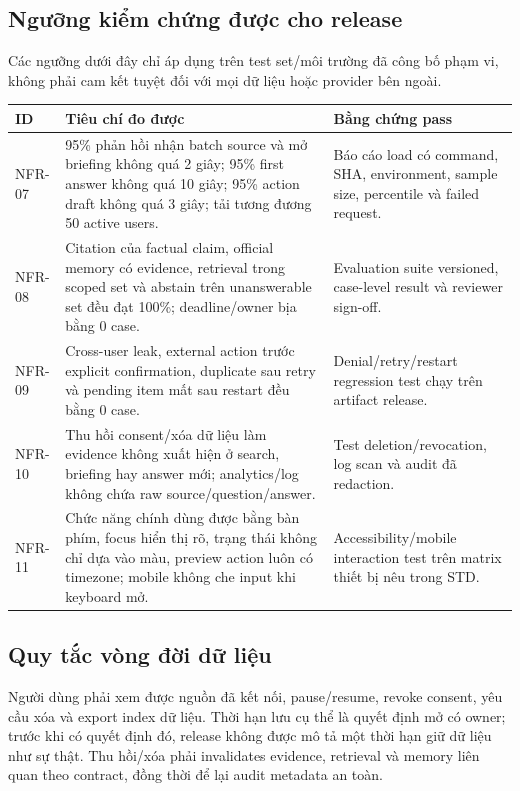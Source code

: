 \documentclass[12pt,a4paper]{article}
\begin{document}
\subsection{Ngưỡng kiểm chứng được cho release}
Các ngưỡng dưới đây chỉ áp dụng trên test set/môi trường đã công bố phạm vi, không phải cam kết tuyệt đối với mọi dữ liệu hoặc provider bên ngoài.
\begin{longtable}{p{1.8cm}p{5.2cm}p{6.8cm}}
\toprule ID & Tiêu chí đo được & Bằng chứng pass \\ \midrule\endhead
NFR-07 & 95\% phản hồi nhận batch source và mở briefing không quá 2 giây; 95\% first answer không quá 10 giây; 95\% action draft không quá 3 giây; tải tương đương 50 active users. & Báo cáo load có command, SHA, environment, sample size, percentile và failed request. \\
NFR-08 & Citation của factual claim, official memory có evidence, retrieval trong scoped set và abstain trên unanswerable set đều đạt 100\%; deadline/owner bịa bằng 0 case. & Evaluation suite versioned, case-level result và reviewer sign-off. \\
NFR-09 & Cross-user leak, external action trước explicit confirmation, duplicate sau retry và pending item mất sau restart đều bằng 0 case. & Denial/retry/restart regression test chạy trên artifact release. \\
NFR-10 & Thu hồi consent/xóa dữ liệu làm evidence không xuất hiện ở search, briefing hay answer mới; analytics/log không chứa raw source/question/answer. & Test deletion/revocation, log scan và audit đã redaction. \\
NFR-11 & Chức năng chính dùng được bằng bàn phím, focus hiển thị rõ, trạng thái không chỉ dựa vào màu, preview action luôn có timezone; mobile không che input khi keyboard mở. & Accessibility/mobile interaction test trên matrix thiết bị nêu trong STD. \\
\bottomrule
\end{longtable}

\subsection{Quy tắc vòng đời dữ liệu}
Người dùng phải xem được nguồn đã kết nối, pause/resume, revoke consent, yêu cầu xóa và export index dữ liệu. Thời hạn lưu cụ thể là quyết định mở có owner; trước khi có quyết định đó, release không được mô tả một thời hạn giữ dữ liệu như sự thật. Thu hồi/xóa phải invalidates evidence, retrieval và memory liên quan theo contract, đồng thời để lại audit metadata an toàn.
\end{document}
